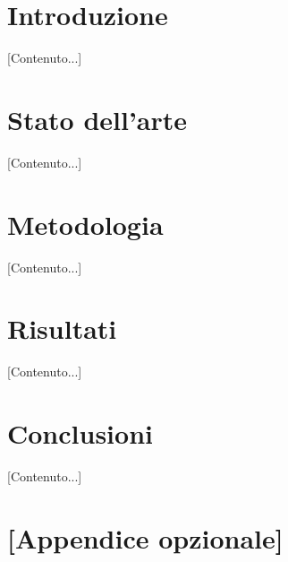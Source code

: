 \documentclass[12pt,a4paper,oneside,openright]{report}
\begin{document}
\tableofcontents
\listoffigures
\listoftables

\chapter{Introduzione}
[Contenuto...]

\chapter{Stato dell'arte}
[Contenuto...]

\chapter{Metodologia}
[Contenuto...]

\chapter{Risultati}
[Contenuto...]

\chapter{Conclusioni}
[Contenuto...]

\printbibliography[heading=bibintoc, title={Bibliografia}]

\appendix
\chapter{[Appendice opzionale]}
\end{document}
